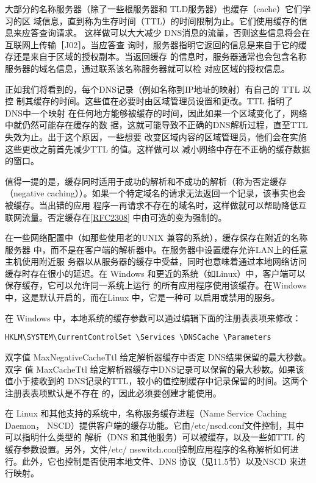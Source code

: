 大部分的名称服务器（除了一些根服务器和 TLD服务器）也缓存（cache）它们学习的区
域信息，直到称为生存时间（TTL）的时间限制为止。它们使用缓存的信息来应答查询请求。
这样做可以大大减少 DNS消息的流量，否则这些信息将会在互联网上传输［J02］。当应答查
询时，服务器指明它返回的信息是来自于它的缓存还是来自于区域的授权副本。当返回缓存
的信息时，服务器通常也会包含名称服务器的域名信息，通过联系该名称服务器就可以检
对应区域的授权信息。

正如我们将看到的，每个DNS记录（例如名称到IP地址的映射）有自己的 TTL 以控
制其缓存的时间。这些值在必要时由区域管理员设置和更改。TTL 指明了 DNS中一个映射
在任何地方能够被缓存的时间，因此如果一个区域变化了，网络中就仍然可能存在缓存的数
据，这就可能导致不正确的DNS解析过程，直至TTL 失效为止。出于这个原因，一些想要
改变区域内容的区域管理员，他们会在实施这些更改之前首先减少TTL 的值。这样做可以
减小网络中存在不正确的缓存数据的窗口。

值得一提的是，缓存同时适用于成功的解析和不成功的解析（称为否定缓存（negative
caching））。如果一个特定域名的请求无法返回一个记录，该事实也会被缓存。当出错的应用
程序一再请求不存在的域名时，这样做就可以帮助降低互联网流量。否定缓存在\href{https://www.rfc-editor.org/rfc/rfc2308}{[RFC2308]}
中由可选的变为强制的。

在一些网络配置中（如那些使用老的UNIX 兼容的系统），缓存保存在附近的名称服务器
中，而不是在客户端的解析器中。在服务器中设置缓存允许LAN上的任意主机使用附近服
务器以从服务器的缓存中受益，同时也意味着通过本地网络访问缓存时存在很小的延迟。在
Windows 和更近的系统（如Linux）中，客户端可以保存缓存，它可以允许同一系统上运行
的所有应用程序使用该缓存。在Windows 中，这是默认开启的，而在Linux 中，它是一种可
以启用或禁用的服务。

在 Windows 中，本地系统的缓存参数可以通过编辑下面的注册表表项来修改：

\begin{verbatim}
HKLM\SYSTEM\CurrentControlSet \Services \DNSCache \Parameters
\end{verbatim}

双字值 MaxNegativeCacheTtl 给定解析器缓存中否定 DNS结果保留的最大秒数。双字
值 MaxCacheTtl 给定解析器缓存中DNS记录可以保留的最大秒数。如果该值小于接收到的
DNS记录的TTL，较小的值控制缓存中记录保留的时间。这两个注册表表项默认是不存在
的，因此必须要创建才能使用。

在 Linux 和其他支持的系统中，名称服务缓存进程（Name Service Caching Daemon，
NSCD）提供客户端的缓存功能。它由/etc/nscd.conf文件控制，其中可以指明什么类型的
解析（DNS 和其他服务）可以被缓存，以及一些如TTL 的缓存参数设置。另外，文件/etc/
nsswitch.conf控制应用程序的名称解析如何进行。此外，它也控制是否使用本地文件、DNS
协议（见11.5节）以及NSCD 来进行映射。

